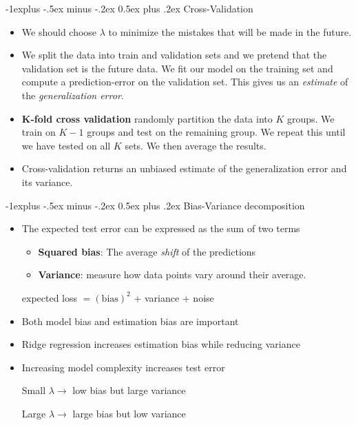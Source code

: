 \documentclass[10pt,a4paper,landscape]{article}
\makeatletter
\renewcommand{\subsection}{\@startsection{subsection}{2}{0mm}%
                                {-1explus -.5ex minus -.2ex}%
                                {0.5ex plus .2ex}%
                                {\normalfont\normalsize\bfseries}}
\makeatother
\begin{document}
\begin{multicols*}{2}
\subsection{Cross-Validation}
\begin{itemize}
	\item We should choose $\lambda$ to minimize the mistakes that will be made in the future.
	\item We split the data into train and validation sets and we pretend that the validation set is the future data. We fit our model on the training set and compute a prediction-error on the validation set. This gives us an \textit{estimate} of the \textit{generalization error}.
	\item \textbf{K-fold cross validation} randomly partition the data into $K$ groups. We train on $K - 1$ groups and test on the remaining group. We repeat this until we have tested on all $K$ sets. We then average the results.
	\item Cross-validation returns an unbiased estimate of the generalization error and its variance.
\end{itemize}

\subsection{Bias-Variance decomposition}
\begin{itemize}
	\item The expected test error can be expressed as the sum of two terms
	\begin{itemize}
	 	\item \textbf{Squared bias}: The average \textit{shift} of the predictions 
	 	\item \textbf{Variance}: measure how data points vary around their average.
	 \end{itemize} 
	 \begin{center}
	 	expected loss $= (\text{bias})^2$ + variance + noise
	 \end{center}
	\item Both model bias and estimation bias are important
	\item Ridge regression increases estimation bias while reducing variance
	\item Increasing model complexity increases test error
	\begin{center}
		Small $\lambda \rightarrow$ low bias but large variance
	\end{center}
	\begin{center}
		Large $\lambda \rightarrow$ large bias but low variance
	\end{center}
\end{itemize}


\end{multicols*}
\end{document}
